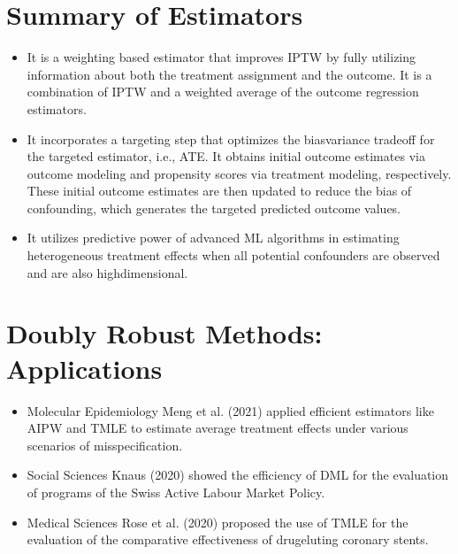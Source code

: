 \documentclass[letterpaper,10pt,english]{jupyterBook}
\begin{document}
\section{Summary of Estimators}
\label{\detokenize{Conclusion:summary-of-estimators}}\begin{itemize}
\item {} 
\sphinxAtStartPar
{} \sphinxhyphen{} It is a weighting based estimator that improves IPTW by fully utilizing information about both the treatment assignment and the outcome. It is a combination of IPTW and a weighted average of the outcome regression estimators.

\item {} 
\sphinxAtStartPar
{} \sphinxhyphen{} It incorporates a targeting step that optimizes the bias\sphinxhyphen{}variance tradeoff for the targeted estimator, i.e., ATE. It obtains initial outcome estimates via outcome modeling and propensity scores via treatment modeling, respectively. These initial outcome estimates are then updated to reduce the bias of confounding, which generates the targeted predicted outcome values.

\item {} 
\sphinxAtStartPar
{} \sphinxhyphen{} It utilizes predictive power of advanced ML algorithms in estimating heterogeneous treatment effects when all potential confounders are observed and are also high\sphinxhyphen{}dimensional.

\end{itemize}


\section{Doubly Robust Methods: Applications}
\label{\detokenize{Conclusion:doubly-robust-methods-applications}}\begin{itemize}
\item {} 
\sphinxAtStartPar
Molecular Epidemiology \sphinxhyphen{} Meng et al. (2021) applied efficient estimators like AIPW and TMLE to estimate average treatment effects under various scenarios of mis\sphinxhyphen{}specification.

\item {} 
\sphinxAtStartPar
Social Sciences \sphinxhyphen{} Knaus (2020) showed the efficiency of DML for the evaluation of programs of the Swiss Active Labour Market Policy.

\item {} 
\sphinxAtStartPar
Medical Sciences \sphinxhyphen{} Rose et al. (2020) proposed the use of TMLE for the evaluation of the comparative effectiveness of drug\sphinxhyphen{}eluting coronary stents.

\end{itemize}
\end{document}
